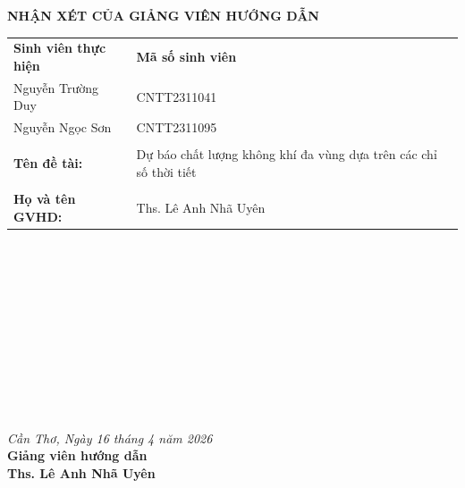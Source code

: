 \newpage
{}
{}

\begin{center}
    \textbf{\Large NHẬN XÉT CỦA GIẢNG VIÊN HƯỚNG DẪN}
\end{center}

\vspace{1cm}

\begin{table}[h]
\begin{tabular}{ll}
\textbf{Sinh viên thực hiện} & \textbf{Mã số sinh viên} \\
Nguyễn Trường Duy            & CNTT2311041              \\
Nguyễn Ngọc Sơn              & CNTT2311095             \\

                           &                          \\
\textbf{Tên đề tài:}       & Dự báo chất lượng không khí đa vùng dựa trên các chỉ số thời tiết \\
                           &                          \\
\textbf{Họ và tên GVHD:}   & Ths. Lê Anh Nhã Uyên     \\
\end{tabular}
\end{table}

\vspace{0.5cm}
\noindent\makebox[\linewidth]{\dotfill} \\
\noindent\makebox[\linewidth]{\dotfill} \\
\noindent\makebox[\linewidth]{\dotfill} \\
\noindent\makebox[\linewidth]{\dotfill} \\
\noindent\makebox[\linewidth]{\dotfill} \\
\noindent\makebox[\linewidth]{\dotfill} \\
\noindent\makebox[\linewidth]{\dotfill} \\
\noindent\makebox[\linewidth]{\dotfill} \\
\noindent\makebox[\linewidth]{\dotfill} \\
\noindent\makebox[\linewidth]{\dotfill} \\
\noindent\makebox[\linewidth]{\dotfill}

\vspace{1cm}

\begin{flushright}
    \textit{Cần Thơ, Ngày 16 tháng 4 năm 2026} \\
    \textbf{Giảng viên hướng dẫn} \\
    \vspace{2cm}
    \textbf{Ths. Lê Anh Nhã Uyên}
\end{flushright}